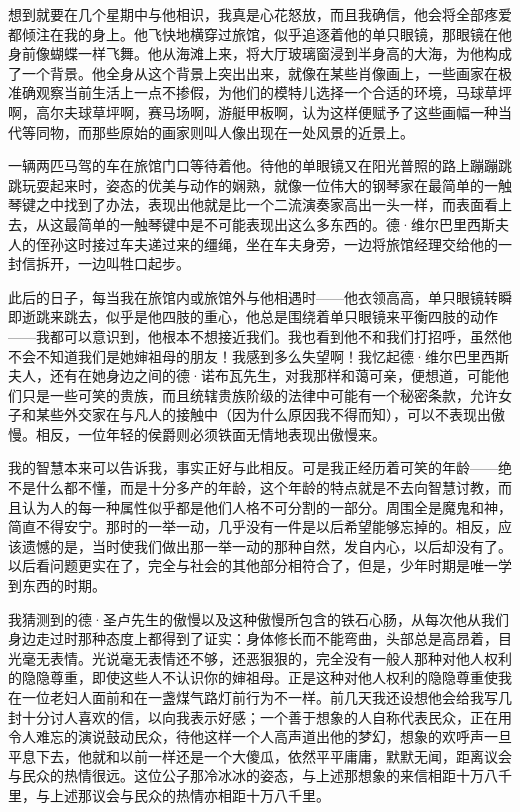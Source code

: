 \par 想到就要在几个星期中与他相识，我真是心花怒放，而且我确信，他会将全部疼爱都倾注在我的身上。他飞快地横穿过旅馆，似乎追逐着他的单只眼镜，那眼镜在他身前像蝴蝶一样飞舞。他从海滩上来，将大厅玻璃窗浸到半身高的大海，为他构成了一个背景。他全身从这个背景上突出出来，就像在某些肖像画上，一些画家在极准确观察当前生活上一点不掺假，为他们的模特儿选择一个合适的环境，马球草坪啊，高尔夫球草坪啊，赛马场啊，游艇甲板啊，认为这样便赋予了这些画幅一种当代等同物，而那些原始的画家则叫人像出现在一处风景的近景上。
\par 一辆两匹马驾的车在旅馆门口等待着他。待他的单眼镜又在阳光普照的路上蹦蹦跳跳玩耍起来时，姿态的优美与动作的娴熟，就像一位伟大的钢琴家在最简单的一触琴键之中找到了办法，表现出他就是比一个二流演奏家高出一头一样，而表面看上去，从这最简单的一触琴键中是不可能表现出这么多东西的。德·维尔巴里西斯夫人的侄孙这时接过车夫递过来的缰绳，坐在车夫身旁，一边将旅馆经理交给他的一封信拆开，一边叫牲口起步。
\par 此后的日子，每当我在旅馆内或旅馆外与他相遇时——他衣领高高，单只眼镜转瞬即逝跳来跳去，似乎是他四肢的重心，他总是围绕着单只眼镜来平衡四肢的动作——我都可以意识到，他根本不想接近我们。我也看到他不和我们打招呼，虽然他不会不知道我们是她婶祖母的朋友！我感到多么失望啊！我忆起德·维尔巴里西斯夫人，还有在她身边之间的德·诺布瓦先生，对我那样和蔼可亲，便想道，可能他们只是一些可笑的贵族，而且统辖贵族阶级的法律中可能有一个秘密条款，允许女子和某些外交家在与凡人的接触中（因为什么原因我不得而知），可以不表现出傲慢。相反，一位年轻的侯爵则必须铁面无情地表现出傲慢来。
\par 我的智慧本来可以告诉我，事实正好与此相反。可是我正经历着可笑的年龄——绝不是什么都不懂，而是十分多产的年龄，这个年龄的特点就是不去向智慧讨教，而且认为人的每一种属性似乎都是他们人格不可分割的一部分。周围全是魔鬼和神，简直不得安宁。那时的一举一动，几乎没有一件是以后希望能够忘掉的。相反，应该遗憾的是，当时使我们做出那一举一动的那种自然，发自内心，以后却没有了。以后看问题更实在了，完全与社会的其他部分相符合了，但是，少年时期是唯一学到东西的时期。
\par 我猜测到的德·圣卢先生的傲慢以及这种傲慢所包含的铁石心肠，从每次他从我们身边走过时那种态度上都得到了证实：身体修长而不能弯曲，头部总是高昂着，目光毫无表情。光说毫无表情还不够，还恶狠狠的，完全没有一般人那种对他人权利的隐隐尊重，即使这些人不认识你的婶祖母。正是这种对他人权利的隐隐尊重使我在一位老妇人面前和在一盏煤气路灯前行为不一样。前几天我还设想他会给我写几封十分讨人喜欢的信，以向我表示好感；一个善于想象的人自称代表民众，正在用令人难忘的演说鼓动民众，待他这样一个人高声道出他的梦幻，想象的欢呼声一旦平息下去，他就和以前一样还是一个大傻瓜，依然平平庸庸，默默无闻，距离议会与民众的热情很远。这位公子那冷冰冰的姿态，与上述那想象的来信相距十万八千里，与上述那议会与民众的热情亦相距十万八千里。
